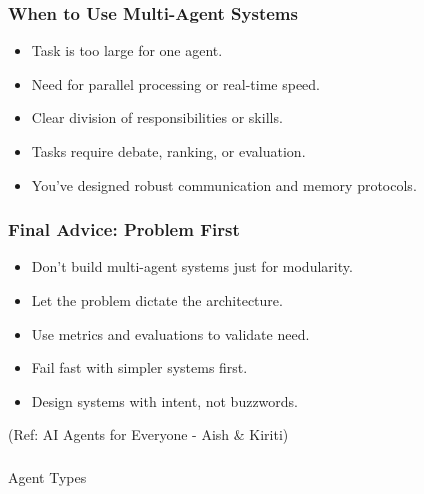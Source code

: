 \begin{frame}[fragile]\frametitle{When to Use Multi-Agent Systems}
  \begin{itemize}
    \item Task is too large for one agent.
    \item Need for parallel processing or real-time speed.
    \item Clear division of responsibilities or skills.
    \item Tasks require debate, ranking, or evaluation.
    \item You’ve designed robust communication and memory protocols.
  \end{itemize}
\end{frame}

\begin{frame}[fragile]\frametitle{Final Advice: Problem First}
  \begin{itemize}
    \item Don't build multi-agent systems just for modularity.
    \item Let the problem dictate the architecture.
    \item Use metrics and evaluations to validate need.
    \item Fail fast with simpler systems first.
    \item Design systems with intent, not buzzwords.
  \end{itemize}
  
  {\tiny (Ref: AI Agents for Everyone - Aish \& Kiriti)}
\end{frame}

\begin{frame}[fragile]\frametitle{}
\begin{center}
{\Large Agent Types}
\end{center}
\end{frame}

